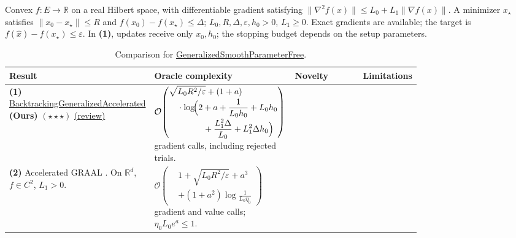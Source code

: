 \begin{table}[tp]
\centering
\caption{Comparison for \href{https://github.com/k3nfalt/longtails/blob/main/LongTails/Setups/GeneralizedSmoothParameterFree.lean}{GeneralizedSmoothParameterFree}.}\label{tab:GeneralizedSmoothParameterFree}
\parbox{\linewidth}{\footnotesize Convex $f:E\to\mathbb R$ on a real Hilbert space, with differentiable gradient satisfying $\|\nabla^2 f(x)\|\le L_0+L_1\|\nabla f(x)\|$. A minimizer $x_\star$ satisfies $\|x_0-x_\star\|\le R$ and $f(x_0)-f(x_\star)\le\Delta$; $L_0,R,\Delta,\varepsilon,h_0>0$, $L_1\ge0$. Exact gradients are available; the target is $f(\widehat x)-f(x_\star)\le\varepsilon$. In \textbf{(1)}, updates receive only $x_0,h_0$; the stopping budget depends on the setup parameters.}\par\smallskip
\begin{threeparttable}
\footnotesize
\setlength{\tabcolsep}{4pt}\renewcommand{\arraystretch}{1.25}
\begin{tabularx}{\linewidth}{@{}>{\raggedright\arraybackslash}p{0.20\linewidth}>{\raggedright\arraybackslash}p{0.33\linewidth}>{\raggedright\arraybackslash}p{0.25\linewidth}>{\raggedright\arraybackslash}X@{}}
\toprule
\textbf{Result} & \textbf{Oracle complexity} & \textbf{Novelty} & \textbf{Limitations} \\
\midrule
\textbf{(1)} \href{https://github.com/k3nfalt/longtails/blob/main/LongTails/Theorems/BacktrackingGeneralizedAccelerated.lean}{Backtracking\allowbreak Generalized\allowbreak Accelerated} \textbf{(Ours)} $(\star\star\star)$ \href{https://github.com/k3nfalt/longtails/blob/main/scripts/reviews/BacktrackingGeneralizedAccelerated.md}{(review)}
& $\displaystyle\mathcal{O}\!\left(\begin{aligned}&\sqrt{L_0R^2/\varepsilon}+(1+a)\\[-2pt]&\quad\cdot\log\!\Bigl(2+a+\frac1{L_0h_0}+L_0h_0\\[-2pt]&\qquad\qquad+\frac{L_1^2\Delta}{L_0}+L_1^2\Delta h_0\Bigr)\end{aligned}\right)$ gradient calls, including rejected trials.
& & \\
\midrule[1.2pt]
\textbf{(2)} Accelerated GRAAL \citep[Cor.~3]{BorodichKovalev2025GraalV2}. On $\mathbb R^d$, $f\in C^2$, $L_1>0$.
& $\displaystyle\mathcal{O}\!\left(\begin{aligned}&1+\sqrt{L_0R^2/\varepsilon}+a^3\\[-2pt]&+(1+a^2)\log\frac1{L_0\eta_0}\end{aligned}\right)$ gradient and value calls; $\eta_0L_0e^a\le1$.

\end{tabularx}
\end{threeparttable}
\end{table}
